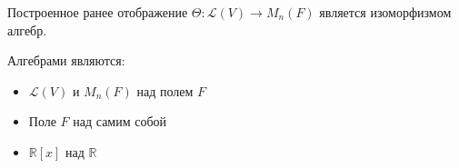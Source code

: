 \begin{note}
	Построенное ранее отображение $\Theta: \mathcal{L}(V) \rightarrow M_n(F)$ является изоморфизмом алгебр.
\end{note}

\begin{example}
	Алгебрами являются:
	\begin{itemize}
		\item $\mathcal{L}(V)$ и $M_n(F)$ над полем $F$
		\item Поле $F$ над самим собой
		\item $\mathbb{R}[x]$ над $\mathbb{R}$
	\end{itemize}
\end{example}